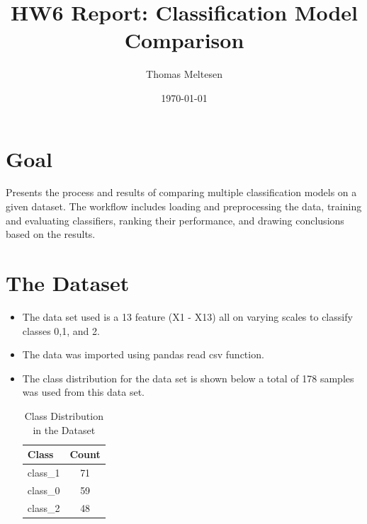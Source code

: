 \documentclass[12pt]{article}
\title {HW6 Report: Classification Model Comparison}
\author{Thomas Meltesen}
\date{\today}
\begin{document}
\maketitle

\section{Goal}
Presents the process and results of comparing multiple classification models on a given dataset. The workflow includes loading and preprocessing the data, training and evaluating classifiers, ranking their performance, and drawing conclusions based on the results.

\section{The Dataset}
\begin{itemize}
    \item The data set used is a 13 feature (X1 - X13) all on varying scales to classify classes 0,1, and 2.
    \item The data was imported using pandas read csv function.
    \item The class distribution for the data set is shown below a total of 178 samples was used from this data set.
\begin{table}[h!]
\centering

\begin{tabular}{lc}
\hline
Class    & Count \\
\hline
class\_1 & 71    \\
class\_0 & 59    \\
class\_2 & 48    \\
\hline
\end{tabular}
\caption{Class Distribution in the Dataset}
\end{table}
\end{itemize}
\end{document}
